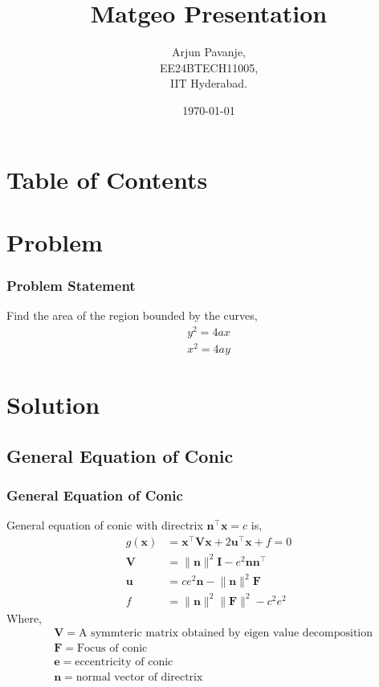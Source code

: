 \documentclass{beamer}
\title{Matgeo Presentation}
\author{Arjun Pavanje,\\ EE24BTECH11005,\\IIT Hyderabad.\\}
\date{\today}
\providecommand{\brak}[1]{\ensuremath{\left(#1\right)}}
\theoremstyle{remark}
\providecommand{\norm}[1]{\lVert#1\rVert}
\let\vec\mathbf
\numberwithin{equation}{section}
\begin{document}
		\begin{frame}
			\titlepage
		\end{frame}

		\section*{Table of Contents}
		\begin{frame}
			\tableofcontents
		\end{frame}
		\section{Problem}
		\begin{frame}
			\frametitle{Problem Statement}
			Find the area of the region bounded by the curves,
			\begin{align}
				y^2=4ax\\
				x^2=4ay
			\end{align}
		\end{frame}
		\section{Solution}
		\subsection{General Equation of Conic}
		\begin{frame}
			\frametitle{General Equation of Conic}
			General equation of conic with directrix $\vec{n}^{\top}\vec{x}=c$ is,
			\begin{align}
				g\brak{\vec{x}}&=\vec{x}^{\top}\vec{V}\vec{x}+2\vec{u}^{\top}\vec{x}+f=0\\
				\vec{V}&=\norm{\vec{n}}^2\vec{I}-e^2\vec{n}\vec{n}^{\top}\\
				\vec{u}&=ce^2\vec{n}-\norm{\vec{n}}^2\vec{F}\\
				f&=\norm{\vec{n}}^2\norm{\vec{F}}^2-c^2e^2
			\end{align}
			Where,
			\begin{align*}
				&\vec{V}=\text{A symmteric matrix obtained by eigen value decomposition}\\
				&\vec{F}=\text{Focus of conic}\\
				&\vec{e}=\text{eccentricity of conic}\\
				&\vec{n}=\text{normal vector of directrix}
			\end{align*}
		\end{frame}
\end{document}
